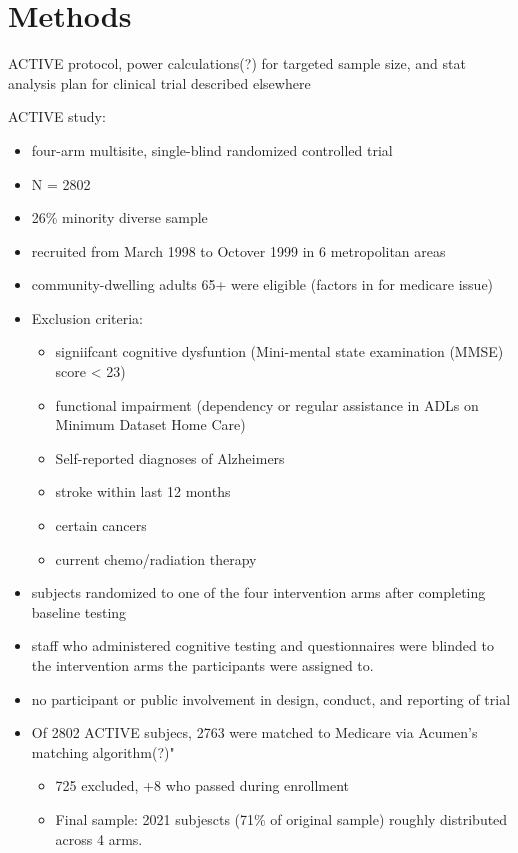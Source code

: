 \documentclass[11pt]{article}
\begin{document}
\section{Methods}
\label{sec:orgd92fb58}

ACTIVE protocol, power calculations(?) for targeted sample size, and stat analysis plan for clinical trial described elsewhere

ACTIVE study:
\begin{itemize}
\item four-arm multisite, single-blind randomized controlled trial
\item N = 2802
\item 26\% minority diverse sample
\item recruited from March 1998 to Octover 1999 in 6 metropolitan areas
\item community-dwelling adults 65+ were eligible (factors in for medicare issue)
\item Exclusion criteria:
\begin{itemize}
\item signiifcant cognitive dysfuntion (Mini-mental state examination (MMSE) score < 23)
\item functional impairment (dependency or regular assistance in ADLs on Minimum Dataset Home Care)
\item Self-reported diagnoses of Alzheimers
\item stroke within last 12 months
\item certain cancers
\item current chemo/radiation therapy
\end{itemize}

\item subjects randomized to one of the four intervention arms after completing baseline testing
\item staff who administered cognitive testing and questionnaires were blinded to the intervention arms the participants were assigned to.
\item no participant or public involvement in design, conduct, and reporting of trial

\item Of 2802 ACTIVE subjecs, 2763 were matched to Medicare via Acumen's matching algorithm(?)"
\begin{itemize}
\item 725 excluded, +8 who passed during enrollment
\item Final sample: 2021 subjescts (71\% of original sample) roughly distributed across 4 arms.
\end{itemize}
\end{itemize}
\end{document}
